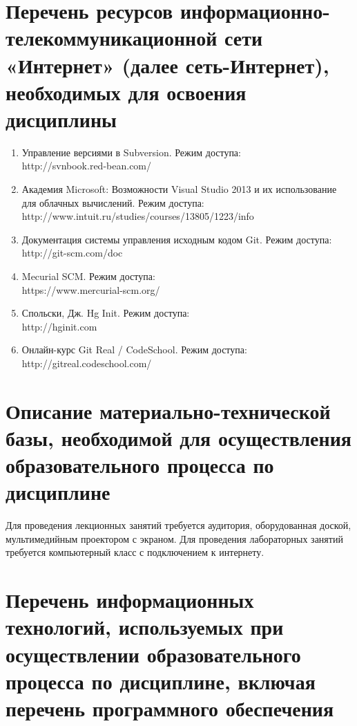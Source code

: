 \documentclass[a4paper,12pt]{article}
\begin{document}
\section{Перечень ресурсов информационно-телекоммуникационной сети «Интернет» (далее сеть-Интернет), необходимых для освоения дисциплины}
\begin{enumerate}
  
  \item Управление версиями в Subversion. Режим доступа:\\ http://svnbook.red-bean.com/ 
  
  \item Академия Microsoft: Возможности Visual Studio 2013 и их использование для облачных вычислений. Режим доступа:\\ http://www.intuit.ru/studies/courses/13805/1223/info 
  
  \item Документация системы управления исходным кодом Git. Режим доступа:\\ http://git-scm.com/doc 
  
  \item Mecurial SCM. Режим доступа:\\ https://www.mercurial-scm.org/ 
  
  \item Спольски, Дж. Hg Init. Режим доступа:\\ http://hginit.com 
  
  \item Онлайн-курс Git Real / CodeSchool. Режим доступа: \\ http://gitreal.codeschool.com/ 
  
\end{enumerate}


\newpage
\section{Описание материально-технической базы, необходимой для осуществления образовательного процесса по дисциплине}
  
  
       Для проведения лекционных занятий требуется аудитория, оборудованная доской,  мультимедийным проектором с экраном. 
       Для проведения лабораторных занятий требуется компьютерный класс с подключением к интернету.
  
  


\section{Перечень информационных технологий, используемых при осуществлении образовательного процесса по дисциплине, включая перечень программного обеспечения
}
\end{document}
